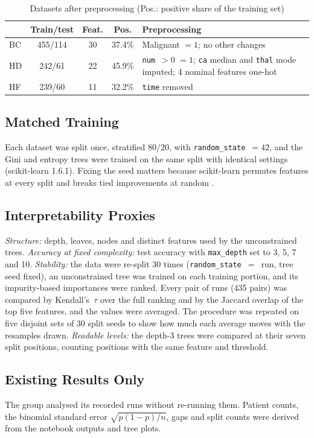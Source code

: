 \documentclass[conference,10pt]{IEEEtran}
\begin{document}
\begin{table}[!t]
\caption{Datasets after preprocessing (Pos.: positive share of the training set)}
\label{tab:data}
\centering
\footnotesize
\setlength{\tabcolsep}{3pt}
\begin{tabular}{@{}l c c c >{\raggedright\arraybackslash}p{3.0cm}@{}}
\hline
 & Train/test & Feat. & Pos. & Preprocessing \\
\hline
BC & 455/114 & 30 & 37.4\% & Malignant $=1$; no other changes \\
HD & 242/61 & 22 & 45.9\% & \texttt{num}~$>0$ $=1$; \texttt{ca} median and \texttt{thal} mode imputed; 4 nominal features one-hot \\
HF & 239/60 & 11 & 32.2\% & \texttt{time} removed \\
\hline
\end{tabular}
\end{table}

\subsection{Matched Training}
Each dataset was split once, stratified 80/20, with \texttt{random\_state}~$=42$, and the Gini and entropy trees were trained on the same split with identical settings (scikit-learn 1.6.1). Fixing the seed matters because scikit-learn permutes features at every split and breaks tied improvements at random \cite{sklearnDTC}.

\subsection{Interpretability Proxies}
\textit{Structure:} depth, leaves, nodes and distinct features used by the unconstrained trees. \textit{Accuracy at fixed complexity:} test accuracy with \texttt{max\_depth} set to 3, 5, 7 and 10. \textit{Stability:} the data were re-split 30 times (\texttt{random\_state}~$=$~run, tree seed fixed), an unconstrained tree was trained on each training portion, and its impurity-based importances were ranked. Every pair of runs (435 pairs) was compared by Kendall's~$\tau$ over the full ranking and by the Jaccard overlap of the top five features, and the values were averaged. The procedure was repeated on five disjoint sets of 30 split seeds to show how much each average moves with the resamples drawn. \textit{Readable levels:} the depth-3 trees were compared at their seven split positions, counting positions with the same feature and threshold.

\subsection{Existing Results Only}
The group analysed its recorded runs without re-running them. Patient counts, the binomial standard error $\sqrt{p(1-p)/n}$, gaps and split counts were derived from the notebook outputs and tree plots.
\end{document}
